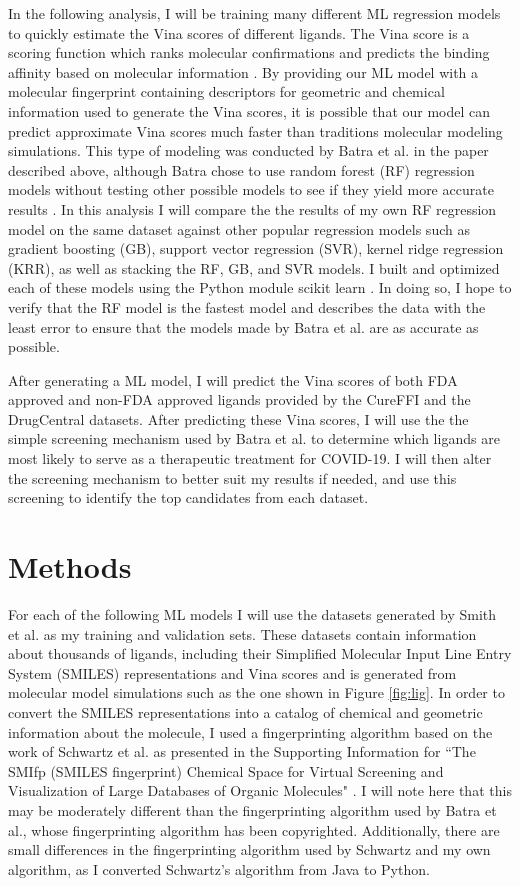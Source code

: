 \documentclass[11pt]{article}
\begin{document}
  In the following analysis, I will be training many different ML regression models to quickly estimate the Vina scores of different ligands. The Vina score is a scoring function which ranks molecular confirmations and predicts the binding affinity based on molecular information \cite{batra}. By providing our ML model with a molecular fingerprint containing descriptors for geometric and chemical information used to generate the Vina scores, it is possible that our model can predict approximate Vina scores much faster than traditions molecular modeling simulations. This type of modeling was conducted by Batra et al. in the paper described above, although Batra chose to use random forest (RF) regression models without testing other possible models to see if they yield more accurate results \cite{batra}. In this analysis I will compare the the results of my own RF regression model on the same dataset against other popular regression models such as gradient boosting (GB), support vector regression (SVR), kernel ridge regression (KRR), as well as stacking the RF, GB, and SVR models. I built and optimized each of these models using the Python module scikit learn \cite{scikit}. In doing so, I hope to verify that the RF model is the fastest model and describes the data with the least error to ensure that the models made by Batra et al. are as accurate as possible.
  
  After generating a ML model, I will predict the Vina scores of both FDA approved and non-FDA approved ligands provided by the CureFFI and the DrugCentral datasets. After predicting these Vina scores, I will use the the simple screening mechanism used by Batra et al. to determine which ligands are most likely to serve as a therapeutic treatment for COVID-19. I will then alter the screening mechanism to better suit my results if needed, and use this screening to identify the top candidates from each dataset.
  
  \section{Methods}
  For each of the following ML models I will use the datasets generated by Smith et al. as my training and validation sets. These datasets contain information about thousands of ligands, including their Simplified Molecular Input Line Entry System (SMILES) representations and Vina scores and is generated from molecular model simulations such as the one shown in Figure \ref{fig:lig}. In order to convert the SMILES representations into a catalog of chemical and geometric information about the molecule, I used a fingerprinting algorithm based on the work of Schwartz et al. as presented in the Supporting Information for ``The SMIfp (SMILES fingerprint) Chemical Space for Virtual Screening and Visualization of Large Databases of Organic Molecules" \cite{schwartz}. I will note here that this may be moderately different than the fingerprinting algorithm used by Batra et al., whose fingerprinting algorithm has been copyrighted. Additionally, there are small differences in the fingerprinting algorithm used by Schwartz and my own algorithm, as I converted Schwartz's algorithm from Java to Python. 
  
\end{document}
